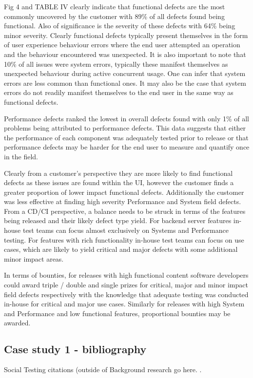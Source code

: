 Fig 4 and TABLE IV clearly indicate that functional defects are the most commonly uncovered by the customer with 89\% of all defects found being functional. Also of significance is the severity of these defects with 64\% being minor severity. Clearly functional defects typically present themselves in the form of user experience behaviour errors where the end user attempted an operation and the behaviour encountered was unexpected. It is also important to note that 10\% of all issues were system errors, typically these manifest themselves as unexpected behaviour during active concurrent usage. One can infer that system errors are less common than functional ones. It may also be the case that system errors do not readily manifest themselves to the end user in the same way as functional defects. \par

Performance defects ranked the lowest in overall defects found with only 1\% of all problems being attributed to performance defects.  This data suggests that either the performance of each component was adequately tested prior to release or that performance defects may be harder for the end user to measure and quantify once in the field.  \par

Clearly from a customer's perspective they are more likely to find functional defects as these issues are found within the UI, however the customer finds a greater proportion of lower impact functional defects. Additionally the customer was less effective at finding high severity Performance and System field defects. From a CD/CI perspective, a balance needs to be struck in terms of the features being released and their likely defect type yield. For backend server features in-house test teams can focus almost exclusively on Systems and Performance testing. For features with rich functionality in-house test teams can focus on use cases, which are likely to yield critical and major defects with some additional minor impact areas. \par

In terms of bounties, for releases with high functional content software developers could award triple / double and single prizes for critical, major and minor impact field defects respectively with the knowledge that adequate testing was conducted in-house for critical and major use cases. Similarly for releases with high System and Performance and low functional features, proportional bounties may be awarded.


\subsection{Case study 1 - bibliography}
Social Testing citations (outside of Background research go here. \cite{ref1}.


